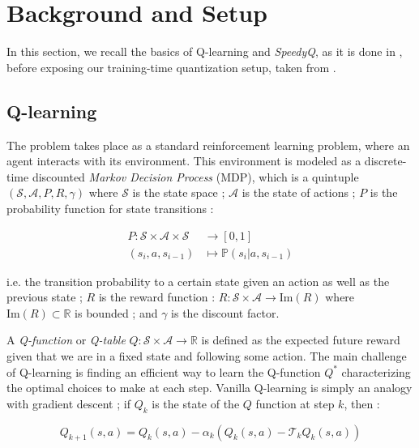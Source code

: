 \documentclass[10pt,conference,compsocconf]{IEEEtran}
\begin{document}
\section{Background and Setup}

    In this section, we recall the basics of Q-learning and \textit{SpeedyQ}, as it is done in \cite{weng2019momentumbasedacceleratedqlearning}, before exposing our training-time quantization setup, taken from \cite{gupta2015}.

    \subsection{Q-learning}

        The problem takes place as a standard reinforcement learning problem, where an agent interacts with its environment. This environment is modeled as a discrete-time discounted \textit{Markov Decision Process} (MDP), which is a quintuple $(\mathcal{S}, \mathcal{A}, P, R, \gamma)$ where $\mathcal{S}$ is the state space ; $\mathcal{A}$ is the state of actions ; $P$ is the probability function for state transitions :

            $$
            \begin{aligned}
                P\colon \mathcal{S} \times \mathcal{A} \times \mathcal{S} & \rightarrow [0, 1] \\
                (s_i, a, s_{i-1}) &\mapsto \mathbb{P}(s_i | a, s_{i-1})
            \end{aligned}
            $$
            
            i.e. the transition probability to a certain state given an action as well as the previous state ; $R$ is the reward function : $R: \mathcal{S} \times \mathcal{A} \rightarrow \text{Im}(R)$ where $\text{Im}(R) \subset \mathbb{R}$ is bounded ;
            and $\gamma$ is the discount factor.

        A \textit{Q-function} or \textit{Q-table} $Q: \mathcal{S} \times \mathcal{A} \to \mathbb{R}$ 
        is defined as the expected future reward given that we are in a fixed state and following some action. The main challenge of Q-learning is finding an efficient way to learn the Q-function $Q^*$ characterizing the optimal choices to make at each step. Vanilla Q-learning is simply an analogy with gradient descent ; if $Q_k$ is the state of the $Q$ function at step $k$, then :

        \begin{equation}
            Q_{k+1}(s, a) = Q_k(s, a) - \alpha_k (Q_k(s, a) - \mathcal{T}_k Q_k(s, a) )
            \label{eq:vanilla_q_learning_update}
        \end{equation}
\end{document}
